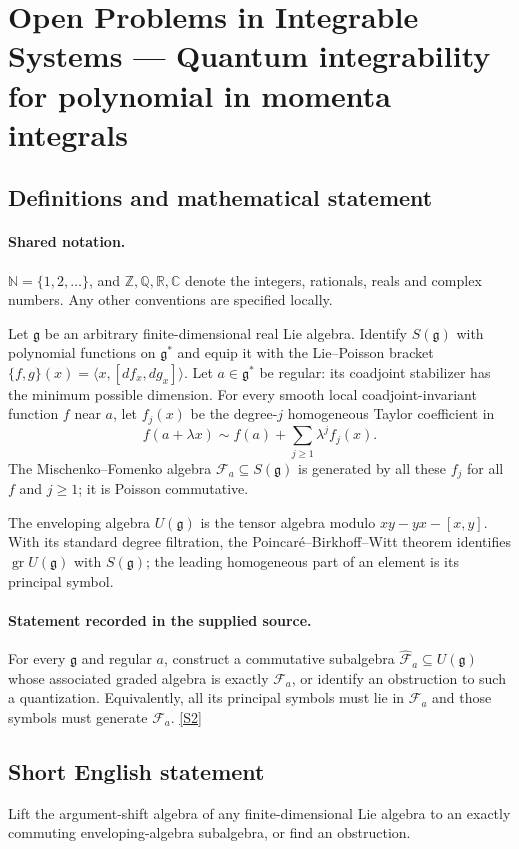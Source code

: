 \documentclass[11pt]{article}
\newcommand{\sref}[2]{\hyperlink{source:#1:#2}{[S#2]}}
\begin{document}
\section{Open Problems in Integrable Systems — Quantum integrability for polynomial in momenta integrals}\label{statement}

\subsection{Definitions and mathematical statement}

\paragraph{Shared notation.}$\mathbb N=\{1,2,\ldots\}$, and $\mathbb Z,\mathbb Q,\mathbb R,\mathbb C$ denote the integers, rationals, reals and complex numbers. Any other conventions are specified locally.


Let $\mathfrak g$ be an arbitrary finite-dimensional real Lie algebra. Identify $S(\mathfrak g)$ with polynomial functions on $\mathfrak g^*$ and equip it with the Lie--Poisson bracket $\{f,g\}(x)=\langle x,[df_x,dg_x]\rangle$. Let $a\in\mathfrak g^*$ be regular: its coadjoint stabilizer has the minimum possible dimension. For every smooth local coadjoint-invariant function $f$ near $a$, let $f_j(x)$ be the degree-$j$ homogeneous Taylor coefficient in
\[ f(a+\lambda x)\sim f(a)+\sum_{j\geq1}\lambda^j f_j(x). \]
The Mischenko--Fomenko algebra $\mathcal F_a\subseteq S(\mathfrak g)$ is generated by all these $f_j$ for all $f$ and $j\geq1$; it is Poisson commutative.\par The enveloping algebra $U(\mathfrak g)$ is the tensor algebra modulo $xy-yx-[x,y]$. With its standard degree filtration, the Poincaré--Birkhoff--Witt theorem identifies $\operatorname{gr}U(\mathfrak g)$ with $S(\mathfrak g)$; the leading homogeneous part of an element is its principal symbol.
\paragraph{Statement recorded in the supplied source.}
For every $\mathfrak g$ and regular $a$, construct a commutative subalgebra $\widehat{\mathcal F}_a\subseteq U(\mathfrak g)$ whose associated graded algebra is exactly $\mathcal F_a$, or identify an obstruction to such a quantization. Equivalently, all its principal symbols must lie in $\mathcal F_a$ and those symbols must generate $\mathcal F_a$. \sref{statement}{2}
\subsection{Short English statement}
Lift the argument-shift algebra of any finite-dimensional Lie algebra to an exactly commuting enveloping-algebra subalgebra, or find an obstruction.
\end{document}
